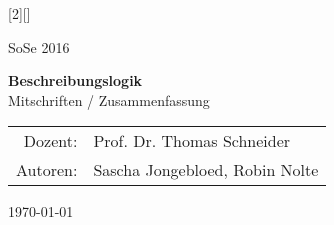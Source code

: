[2][]{
    \thispagestyle{empty}

    \begin{minipage}[H]{\textwidth}
        \vspace{3.5cm}
        \begin{center}
                \Large SoSe 2016 

                \vspace{1cm}
                \LARGE \textbf{Beschreibungslogik} \\

                \vspace{3cm}
                \Large Mitschriften / Zusammenfassung\\
        \end{center}
    \end{minipage}
    \vfill
    \vfill

    \begin{minipage}[H]{\textwidth}
        \begin{center}

                \begin{tabular}{ r l }
                  Dozent: & Prof. Dr. Thomas Schneider\\
                  Autoren: & Sascha Jongebloed, Robin Nolte\\
                \end{tabular}
        \end{center}
    \end{minipage}
    \vspace{.5cm}

    \begin{center}
        \today
    \end{center}
    \newpage
}

\newcommand{\setpagestyle} {
    \pagestyle{fancy}
    \renewcommand{\headrulewidth}{0.1pt}
    \fancyhead[L]{\leftmark}
    \fancyfoot[C]{\thepage}
}

\newcommand{\settableofcontents} {
    \setcounter{tocdepth}{4}
    \tableofcontents
    \newpage
}

\newcommand{\setbibliography} {
    \clearpage
    \phantomsection
    \label{ch:bib}%
    \addcontentsline{toc}{section}{Literatur}%
        \nocite{*}%
}
